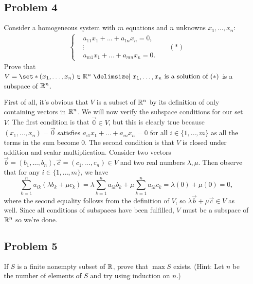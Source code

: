 \documentclass[main.tex]{subfiles}
\begin{document}
\subsection{Problem 4}
\begin{claim}
    Consider a homogeneous system with $m$ equations and $n$ unknowns $x_1,\ldots ,x_n$:
    \begin{align*}
        \left\{\begin{aligned}
            &a_{11}x_1 + \ldots + a_{1n}x_n = 0, \\
            &\vdots \\
            &a_{m1}x_1 + \ldots  + a_{mn}x_n = 0.
        \end{aligned}\right. && (*)
    \end{align*}
Prove that $V = \set*{(x_1,\ldots , x_n) \in \RR^n \mid x_1,\ldots ,x_n\text{ is a solution of }(*)}$ is a subspace of $\mathbb R^n$.
\end{claim}

\begin{soln}
     First of all, it's obvious that $V$ is a subset of $\mathbb R^n$ by its definition of only containing vectors in $\mathbb R^n$. We will now verify the subspace conditions for our set $V$. The first condition is that $\vec{0}\in V$, but this is clearly true because $(x_1, \ldots , x_n) = \vec{0}$ satisfies $a_{i1}x_1 + \ldots + a_{in}x_n = 0$ for all $i\in \{1, \ldots , m\}$ as all the terms in the sum become 0. The second condition is that $V$ is closed under addition and scalar multiplication. Consider two vectors $\vec{b} = (b_1, \ldots , b_n), \vec{c} = (c_1, \ldots , c_n)\in V$ and two real numbers $\lambda, \mu$. Then observe that for any $i\in \{1, \ldots , m\}$, we have
     \[\sum_{k = 1}^n a_{ik}(\lambda b_k + \mu c_k) = \lambda\sum_{k = 1}^n a_{ik}b_k + \mu\sum_{k = 1}^n a_{ik}c_k = \lambda(0) + \mu(0) = 0,\]
     where the second equality follows from the definition of $V$, so $\lambda \vec{b} + \mu \vec{c} \in V$ as well. Since all conditions of subspaces have been fulfilled, $V$ must be a subspace of $\mathbb R^n$ so we're done.
\end{soln}
\eject

\subsection{Problem 5}
\begin{claim}
    If $S$ is a finite nonempty subset of $\mathbb R$, prove that $\max S$ exists. (Hint: Let $n$ be the number of elements of $S$ and try using induction on $n$.)
\end{claim}
\end{document}
